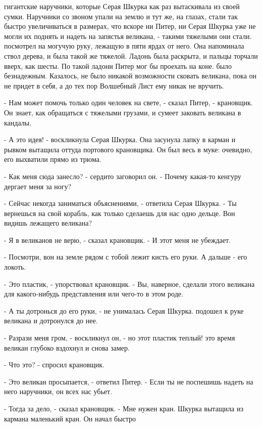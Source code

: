 гигантские наручники, которые Серая Шкурка как раз вытаскивала из 
своей сумки. Наручники со звоном упали на землю и тут же, на глазах, 
стали так быстро увеличиваться в размерах, что вскоре ни Питер, ни 
Серая Шкурка уже не могли их поднять и надеть на запястья великана, - 
такими тяжелыми они стали.
 посмотрел на могучую руку, лежащую в пяти ярдах от него. Она 
напоминала ствол дерева, и была такой же тяжелой. Ладонь была 
раскрыта, и пальцы торчали вверх, как шесты. По такой ладони Питер мог 
бы проехать на коне.
 было безнадежным. Казалось, не было никакой возможности 
сковать великана, пока он не придет в себя, а до тех пор Волшебный 
Лист ему никак не вручить.
\par- Нам может помочь только один человек на свете, - сказал Питер, - 
крановщик. Он знает, как обращаться с тяжелыми грузами, и сумеет 
заковать великана в кандалы.
\par- А это идея! - воскликнула Серая Шкурка. Она засунула лапку в 
карман и рывком вытащила оттуда портового крановщика. Он был весь в 
муке: очевидно, его выхватили прямо из трюма.
\par- Как меня сюда занесло? - сердито заговорил он. - Почему какая-то 
кенгуру дергает меня за ногу?
\par- Сейчас некогда заниматься объяснениями, - ответила Серая Шкурка. 
- Ты вернешься на свой корабль, как только сделаешь для нас одно 
дельце. Вон видишь лежащего великана?
\par- Я в великанов не верю, - сказал крановщик. - И этот меня не 
убеждает.
\par- Посмотри, вон на земле рядом с тобой лежит кисть его руки. А 
дальше - его локоть.
\par- Это пластик, - упорствовал крановщик. - Вы, наверное, сделали 
этого великана для какого-нибудь представления или чего-то в этом 
роде.
\par- А ты дотронься до его руки, - не унималась Серая Шкурка.
 подошел к руке великана и дотронулся до нее.
\par- Разрази меня гром, - воскликнул он, - но этот пластик теплый!
 это время великан глубоко вздохнул и снова замер.
\par- Что это? - спросил крановщик.
\par- Это великан просыпается, - ответил Питер. - Если ты не поспешишь 
надеть на него наручники, он всех нас убьет.
\par- Тогда за дело, - сказал крановщик. - Мне нужен кран.
 Шкурка вытащила из кармана маленький кран. Он начал быстро 
